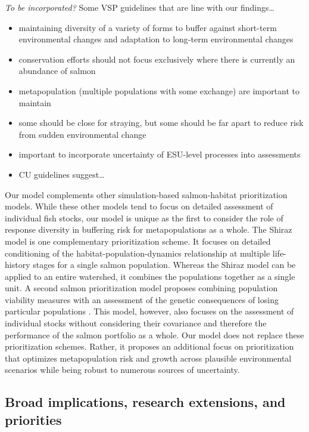 \emph{To be incorporated?} Some VSP guidelines \citep{mceacheran2000} that are line with our findings\ldots{}

\begin{itemize}
\item
  maintaining diversity of a variety of forms to buffer against short-term environmental changes and adaptation to long-term environmental changes
\item
  conservation efforts should not focus exclusively where there is currently an abundance of salmon
\item
  metapopulation (multiple populations with some exchange) are important to maintain
\item
  some should be close for straying, but some should be far apart to reduce risk from sudden environmental change
\item
  important to incorporate uncertainty of ESU-level processes into assessments
\item
  CU guidelines \citep{dfo2005wsp} suggest\ldots{}
\end{itemize}

Our model complements other simulation-based salmon-habitat prioritization models. While these other models tend to focus on detailed assessment of individual fish stocks, our model is unique as the first to consider the role of response diversity in buffering risk for metapopulations as a whole. The Shiraz model \citep{scheuerell2006} is one complementary prioritization scheme. It focuses on detailed conditioning of the habitat-population-dynamics relationship at multiple life-history stages for a single salmon population. Whereas the Shiraz model can be applied to an entire watershed, it combines the populations together as a single unit. A second salmon prioritization model proposes combining population viability measures with an assessment of the genetic consequences of losing particular populations \citep{allendorf1997}. This model, however, also focuses on the assessment of individual stocks without considering their covariance and therefore the performance of the salmon portfolio as a whole. Our model does not replace these prioritization schemes. Rather, it proposes an additional focus on prioritization that optimizes metapopulation risk and growth across plausible environmental scenarios while being robust to numerous sources of uncertainty.

\subsection{Broad implications, research extensions, and priorities}

